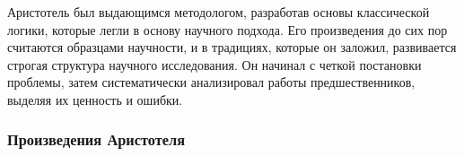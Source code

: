 
Аристотель был выдающимся методологом, разработав основы классической логики, которые легли в основу научного подхода. Его произведения до сих пор считаются образцами научности, и в традициях, которые он заложил, развивается строгая структура научного исследования. Он начинал с четкой постановки проблемы, затем систематически анализировал работы предшественников, выделяя их ценность и ошибки.

\subsubsection{Произведения Аристотеля}

